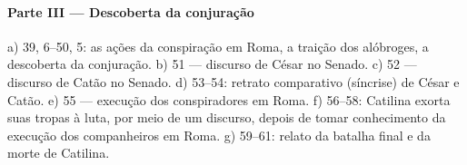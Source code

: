 \paragraph{Parte III --- Descoberta da conjuração}

a)	39, 6--50, 5: as ações da conspiração em Roma, a traição dos alóbroges, a
descoberta da conjuração.  b)	51 --- discurso de César no Senado.  c)	52 ---
discurso de Catão no Senado.  d)	53--54: retrato comparativo (síncrise) de César e Catão.
e)	55 --- execução dos conspiradores em Roma.  f)	56--58: Catilina exorta
suas tropas à luta, por meio de um discurso, depois de tomar conhecimento da
execução dos companheiros em Roma.  g)	59--61: relato da batalha final e da
morte de Catilina. 


